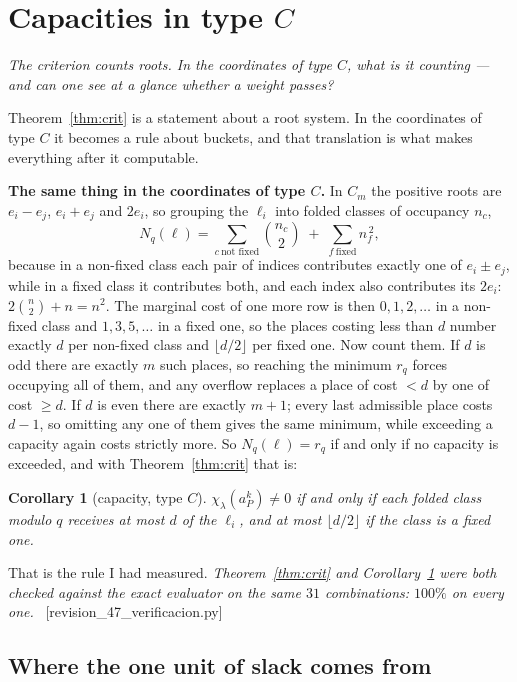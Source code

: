 \documentclass[11pt,a4paper]{article}
\newtheorem{corollary}[theorem]{Corollary}
\theoremstyle{definition}
\newcommand{\ver}[1]{\unskip\penalty0\ \textcolor{azul}{\small\textsf{[#1]}}}
\begin{document}
\section{Capacities in type $C$}\label{sec:cap}

\noindent\emph{The criterion counts roots. In the coordinates of type $C$, what is it counting --- and can one see at a glance whether a weight passes?}

Theorem~\ref{thm:crit} is a statement about a root system. In the coordinates of type $C$ it becomes
a rule about buckets, and that translation is what makes everything after it computable.


\noindent\textbf{The same thing in the coordinates of type $C$.} In $C_m$ the positive roots are $e_i-e_j$,
$e_i+e_j$ and $2e_i$, so grouping the $\ell_i$ into folded classes of occupancy $n_c$,
\[
N_q(\ell)=\sum_{c\ \text{not fixed}}\binom{n_c}{2}\;+\;\sum_{f\ \text{fixed}}n_f^{\,2},
\]
because in a non-fixed class each pair of indices contributes exactly one of $e_i\pm e_j$, while in a
fixed class it contributes both, and each index also contributes its $2e_i$: $2\binom n2+n=n^2$. The
marginal cost of one more row is then $0,1,2,\dots$ in a non-fixed class and $1,3,5,\dots$ in a fixed
one, so the places costing less than $d$ number exactly $d$ per non-fixed class and
$\lfloor d/2\rfloor$ per fixed one. Now count them. If $d$ is odd there are exactly $m$ such places,
so reaching the minimum $r_q$ forces occupying all of them, and any overflow replaces a place of
cost $<d$ by one of cost $\ge d$. If $d$ is even there are exactly $m+1$; every last admissible
place costs $d-1$, so omitting any one of them gives the same minimum, while exceeding a capacity
again costs strictly more. So $N_q(\ell)=r_q$ if and only if no capacity is exceeded, and with
Theorem~\ref{thm:crit} that is:

\begin{corollary}[capacity, type $C$]\label{conj:cap}
$\chi_\lambda(a_P^k)\neq0$ if and only if each folded class modulo $q$ receives \emph{at most $d$} of
the $\ell_i$, and at most $\lfloor d/2\rfloor$ if the class is a fixed one.
\end{corollary}

\noindent That is the rule I had measured.
\emph{Theorem~\ref{thm:crit} and Corollary~\ref{conj:cap} were both checked against the exact
evaluator on the same $31$ combinations: $100\%$ on every one.}
\ver{revision\_47\_verificacion.py}


\subsection*{Where the one unit of slack comes from}
\end{document}
